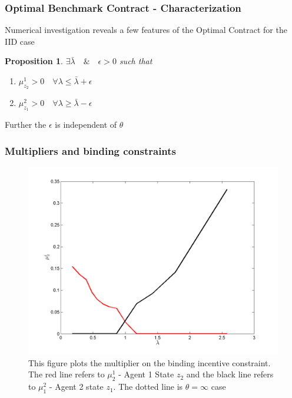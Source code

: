 \documentclass{beamer}
\newtheorem{proposition}{Proposition}
\begin{document}
\begin{frame}
\frametitle{Optimal Benchmark Contract - Characterization}
Numerical investigation reveals a few features of the Optimal Contract for the IID case

\begin{proposition}
$ \exists \bar{\lambda} \quad \&\quad \epsilon > 0$ such that
\begin{enumerate}
	\item $\mu^1_{z_2} > 0 \quad  \forall \lambda \leq \bar{\lambda} +\epsilon$
	\item $\mu^2_{z_1} > 0 \quad  \forall \lambda \geq \bar{\lambda} -\epsilon$
\end{enumerate}
\end{proposition}

Further the $\epsilon$ is independent of $\theta$
\end{frame}


\begin{frame}
\frametitle{Multipliers and binding constraints}
\begin{figure}[htbp]
\centering
	  \includegraphics[scale=0.4]{Matlab/PrivateInformation/Plots/BindingMultipliers.png}

	\caption{ This figure plots the multiplier on the binding incentive
 constraint. The red line refers to $\mu^1_2$ - Agent 1 State $z_2$ and the
 black line refers to $\mu^2_1$ - Agent 2 state $z_1$. The dotted line is
 $\theta=\infty$ case}
	\label{fig:BindingMultipliers}
\end{figure} 
\end{frame}
\end{document}
